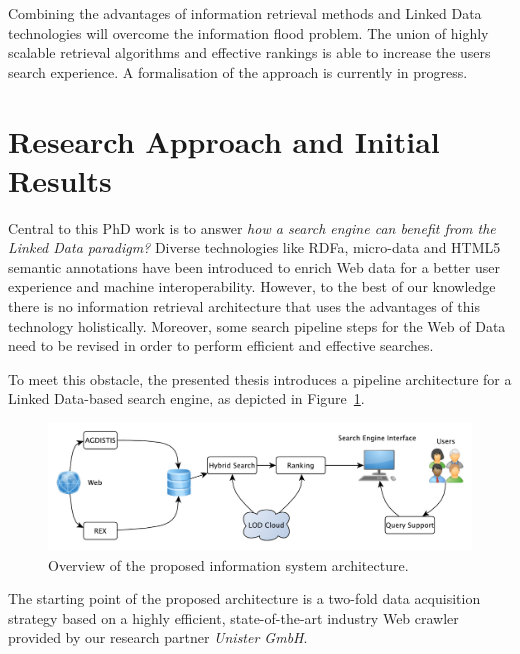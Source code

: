 Combining the advantages of information retrieval methods and Linked Data technologies will overcome the information flood problem. 
The union of highly scalable retrieval algorithms and effective rankings is able to increase the users search experience.
A formalisation of the approach is currently in progress.

\section{Research Approach and Initial Results}\label{approaches}

Central to this PhD work is to answer \emph{how a search engine can benefit from the Linked Data paradigm?}
Diverse technologies like RDFa, micro-data and HTML5 semantic annotations have been introduced to enrich Web data for a better user experience and machine interoperability.
However, to the best of our knowledge there is no information retrieval architecture that uses the advantages of this technology holistically. 
Moreover, some search pipeline steps for the Web of Data need to be revised in order to perform efficient and effective searches.

To meet this obstacle, the presented thesis introduces a pipeline architecture for a Linked Data-based search engine, as depicted in Figure~\ref{overview}.

\begin{figure}[h!tb]
    \centering
        \includegraphics[width=\linewidth]{chapter_one/overview.pdf}
    \caption{Overview of the proposed information system architecture.}
    \label{overview}
\end{figure}

The starting point of the proposed architecture is a two-fold data acquisition strategy based on a highly efficient, state-of-the-art industry Web crawler provided by our research partner \emph{Unister GmbH}.  

